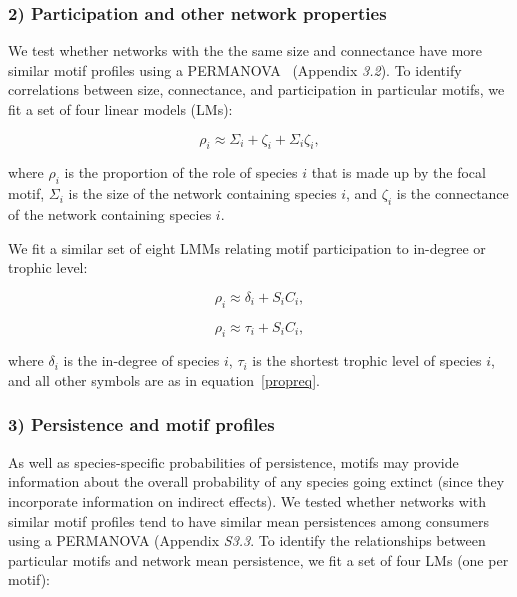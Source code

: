 \documentclass[12pt]{article}
\begin{document}
\begin{spacing}{2.0}
    \subsubsection*{2) Participation and other network properties}    

        
        We test whether networks with the the same size and connectance have more similar motif profiles using a PERMANOVA~\citep{Anderson2001} (Appendix \emph{3.2}). 
        To identify correlations between size, connectance, and participation in particular motifs, we fit a set of four linear models (LMs):
        
        \begin{equation}
            \rho_{i} \approx \Sigma_{i} + \zeta_{i} + \Sigma_{i}\zeta_{i} ,
            \label{partic_SC}
        \end{equation}
        
        where $\rho_{i}$ is the proportion of the role of species $i$ that is made up by the focal motif,
        $\Sigma_{i}$ is the size of the network containing species $i$, and $\zeta_{i}$ is the connectance of the network containing species $i$.
        
        We fit a similar set of eight LMMs relating motif participation to in-degree or trophic level:
        
        \begin{equation}
            \rho_{i} \approx \delta_{i} + S_{i}C_{i} ,
            \label{partic_deg}
        \end{equation}

        \begin{equation}
            \rho_{i} \approx \tau_{i} + S_{i}C_{i} ,
            \label{partic_deg}
        \end{equation}
        
        where $\delta_{i}$ is the in-degree of species $i$, $\tau_{i}$ is the shortest trophic level of species $i$, and all other symbols are as in equation~\ref{propreq}.        
        
        
    \subsubsection*{3) Persistence and motif profiles}

        As well as species-specific probabilities of persistence, motifs may provide information about the overall probability of any species going extinct (since they incorporate information on indirect effects).
        We tested whether networks with similar motif profiles tend to have similar mean persistences among consumers using a PERMANOVA (Appendix \emph{S3.3}.
        To identify the relationships between particular motifs and network mean persistence, we fit a set of four LMs (one per motif):
        

\end{spacing}
\end{document}
